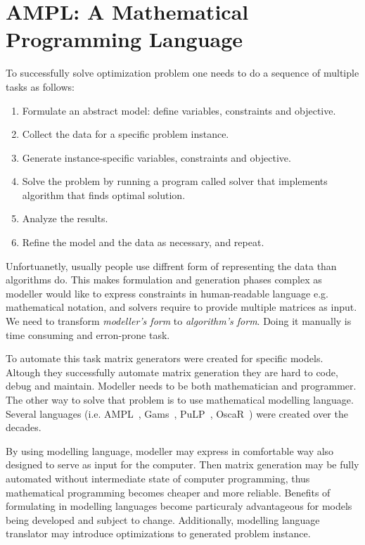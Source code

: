 \section{AMPL: A Mathematical Programming Language}
\label{sec:ampl:ampl}

To successfully solve optimization problem one needs to do a sequence of multiple tasks as follows:

\begin{enumerate}
  \item Formulate an abstract model: define variables, constraints and objective.
  \item Collect the data for a specific problem instance.
  \item Generate instance-specific variables, constraints and objective.
  \item Solve the problem by running a program called solver that implements algorithm that finds optimal solution.
  \item Analyze the results.
  \item Refine the model and the data as necessary, and repeat.
\end{enumerate}

Unfortuanetly, usually people use diffrent form of representing the data than algorithms do. This makes formulation and generation phases complex as modeller would like to express constraints in human-readable language e.g. mathematical notation, and solvers require to provide multiple matrices as input. We need to transform \emph{modeller's form} to \emph{algorithm's form}. Doing it manually is time consuming and erron-prone task.

To automate this task matrix generators were created for specific models. Altough they successfully automate matrix generation they are hard to code, debug and maintain. Modeller needs to be both mathematician and programmer. The other way to solve that problem is to use mathematical modelling language. Several languages (i.e. AMPL~\cite{Fourer2002}, Gams~\cite{Gams}, PuLP~\cite{PuLP}, OscaR~\cite{OscaR}) were created over the decades. 

By using modelling language, modeller may express in comfortable way also designed to serve as input for the computer. Then matrix generation may be fully automated without intermediate state of computer programming, thus mathematical programming becomes cheaper and more reliable. Benefits of formulating in modelling languages become particuraly advantageous for models being developed and subject to change. Additionally, modelling language translator may introduce optimizations to generated problem instance.

